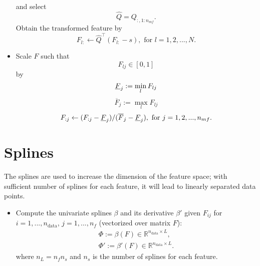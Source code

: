 \documentclass[12pt]{article}
\begin{document}
\begin{itemize}
\begin{equation}
		\end{equation}
		and select
		\begin{equation}
			\hat{Q} = Q_{:, 1:n_{mf}}.
		\end{equation}
		Obtain the transformed feature by
		\begin{equation}
			\label{eq:pca_mol_end}
			F_{l:} \leftarrow \hat{Q}^\top(F_{l:} - s), \text{ for }l = 1,2,...,N.
		\end{equation}
	\item Scale $F$ such that 
	\begin{equation}
		\label{eq:scale_mol_1}
		F_{lj} \in [0, 1]
	\end{equation}
	by
	\begin{equation}
		\label{eq:scale_mol_2}
		\underbar{$F$}_{j} := \min_{l} F_{lj}
	\end{equation}
	\begin{equation}
		\overline{F}_{j} := \max_{l} F_{lj}
	\end{equation}
	\begin{equation}
		F_{:j} \leftarrow (F_{:j} - \underbar{$F$}_{j})/ (\overline{F}_{j} - \underbar{$F$}_{j}), \text{ for } j = 1,2,..., n_{mf}.
	\end{equation}
\end{itemize}


\section{Splines}
The splines are used to increase the dimension of the feature space; with sufficient number of splines for each feature, it will lead to linearly separated data points.
\begin{itemize}
	\item Compute the univariate splines $\beta$ and its derivative $\beta'$ given $F_{ij}$ for $i = 1,...,n_\text{data}$, $j = 1,...,n_f$ (vectorized over matrix $F$):
	\begin{equation}
		\label{eq:spline}
		\begin{split}
			\Phi := \beta(F) \in \mathbb{R}^{n_\text{data} \times L}, \\
			\Phi' := \beta'(F) \in \mathbb{R}^{n_\text{data} \times L}.
		\end{split}
	\end{equation}
	where $n_L = n_fn_s$ and $n_s$ is the number of splines for each feature.
\end{itemize}
\end{document}
